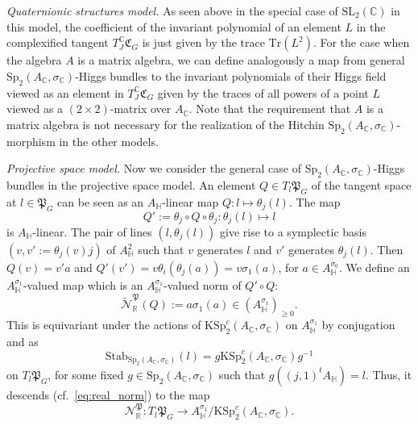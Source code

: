 \documentclass[oneside,11pt]{amsart}
\theoremstyle{definition}
\theoremstyle{remark}
\numberwithin{thm}{section}
\numberwithin{equation}{section}
\begin{document}
\vspace{2mm}

\noindent \textit{Quaternionic structures model.} As seen above in the special case of $\mathrm{SL}_2( \mathbb{C})$ in this model, the coefficient of the invariant polynomial of an element $L$ in the complexified tangent $T^{\mathbb{C}}_J\mathfrak{C}_G$ is just given by the trace $\mathrm{Tr}(L^2)$. For the case when the algebra $A$ is a matrix algebra, we can define analogously a map from general $\mathrm{Sp}_2(A_{\mathbb{C}}, \sigma_{\mathbb{C}})$-Higgs bundles to the invariant polynomials of their Higgs field viewed as an element in $T^{\mathbb{C}}_J\mathfrak{C}_G$ given by the traces of all powers of a point $L$ viewed as a $(2 \times 2)$-matrix over $A_{\mathbb{C}}$. Note that the requirement that $A$ is a matrix algebra is not necessary for the realization of the Hitchin $\mathrm{Sp}_2(A_{\mathbb{C}}, \sigma_{\mathbb{C}})$-morphism in the other models.



\vspace{2mm}

\noindent \textit{Projective space model.} 
Now we consider the general case of $\mathrm{Sp}_2(A_\mathbb{C},\sigma_\mathbb C)$-Higgs bundles in the projective space model. An element $Q\in T_l\mathfrak{P}_G$ of the tangent space at $l\in \mathfrak{P}_G$ can be seen as an $A_\mathbb H$-linear map $Q \colon  l \mapsto \theta_j(l)$. The map
    $$Q':=\theta_j\circ Q\circ\theta_j \colon  \theta_j(l) \mapsto l$$
is $A_\mathbb H$-linear. The pair of lines $(l,\theta_j(l))$ give rise to a symplectic basis $(v,v':=\theta_j(v)j)$ of $A_\mathbb H^2$ such that $v$ generates $l$ and $v'$ generates $\theta_j(l)$. Then $Q(v)=v'a$ and $Q'(v')=v\theta_i(\theta_j(a))=v\sigma_1(a)$, for $a\in A_\mathbb H^{\sigma_0}$. 
We define an $A_\mathbb H^{\sigma_1}$-valued map which is an $A_\mathbb H^{\sigma_1}$-valued norm of $Q' \circ Q$: 
\[\tilde{\mathcal N}_\mathbb R^\mathfrak P(Q) :=a\sigma_1(a)\in (A_\mathbb H^{\sigma_1})_{\geq 0}.\]
This is equivariant under the actions of $\mathrm{KSp}^c_2(A_\mathbb C,\sigma_\mathbb C)$ on $A_\mathbb H^{\sigma_1}$ by conjugation and 
as 
\[\mathrm{Stab}_{\mathrm{Sp}_2(A_\mathbb C,\sigma_\mathbb C)}(l)=g\mathrm{KSp}^c_2(A_\mathbb C,\sigma_\mathbb C)g^{-1}\] on $T_l\mathfrak{P}_G$, for some fixed $g\in \mathrm{Sp}_2(A_\mathbb C,\sigma_\mathbb C)$ such that $g((j,1)^tA_\mathbb H)=l$. Thus, it descends (cf.~\eqref{eq:real_norm}) to the map \[{\mathcal N}_\mathbb R^\mathfrak P\colon T_l \mathfrak{P}_G\to A^{\sigma_1}_\mathbb H/\mathrm{KSp}^c_2(A_\mathbb C,\sigma_{\mathbb C}).\]
\end{document}
